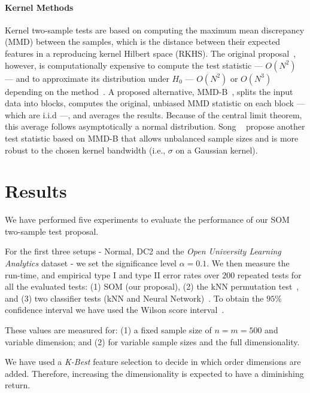 \paragraph{Kernel Methods}
Kernel two-sample tests are based on computing the maximum mean discrepancy (MMD) between the samples,
which is the distance between their expected features in a reproducing kernel Hilbert space (RKHS).
The original proposal~\cite{gretton2012kernel}, however, is computationally
expensive to compute the test statistic --- $O(N^2)$ --- and to approximate its distribution under
$H_0$ --- $O(N^2)$ or $O(N^3)$ depending on the method~\cite{zaremba2013b}.
A proposed alternative, MMD-B~\cite{zaremba2013b}, splits the input data into blocks, computes the original,
unbiased MMD statistic on each block --- which are i.i.d ---, and averages the results.
Because of the central limit theorem, this average follows asymptotically a normal distribution.
Song \etal~\cite{song2021fast} propose another test statistic based on MMD-B that allows
unbalanced sample sizes and is more robust to the chosen kernel bandwidth (i.e., $\sigma$ on a Gaussian kernel).

\section{Results}
\label{sec:som_results}

We have performed five experiments to evaluate the performance of our \gls{SOM} 
two-sample test proposal.

For the first three setups - Normal, DC2 and the \emph{Open University Learning Analytics} dataset
- we set the significance level $\alpha = 0.1$. We then measure the run-time, and empirical 
type I and type II error rates over $200$ repeated tests for all the evaluated
tests: (1) \gls{SOM}  (our proposal), (2) the kNN permutation test~\cite{Schilling1986b},
and (3) two classifier tests (kNN and Neural Network)~\cite{lopez2016revisiting}.
To obtain the $95\%$ confidence interval we have used the Wilson score interval~\cite{Wilson1927}.

These values are measured for: (1) a fixed sample size of $n = m = 500$ and variable dimension;
and (2) for variable sample sizes and the full dimensionality.

We have used a \emph{K-Best} feature selection to decide in which order dimensions are added.
Therefore, increasing the dimensionality is expected to have a diminishing return.

